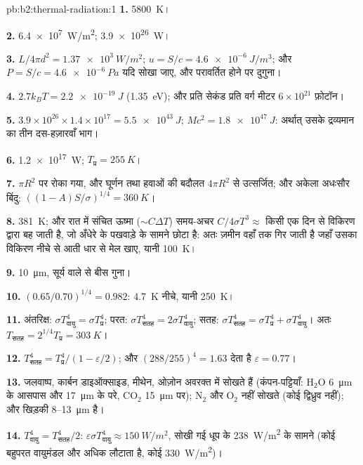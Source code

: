 \begin{solution}{pb:b2:thermal-radiation:1}
\textbf{1.} \qty{5800}{K}।

\textbf{2.} \qty{6.4e7}{W/m^2}; \qty{3.9e26}{W}।

\textbf{3.} $L/4\pi d^2 = \qty{1.37e3}{W/m^2}$; $u = S/c = \qty{4.6e-6}{J/m^3}$;
और $P = S/c = \qty{4.6e-6}{Pa}$ यदि सोखा जाए, और परावर्तित होने पर दुगुना।

\textbf{4.} $2.7k_BT = \qty{2.2e-19}{J}$ (\qty{1.35}{eV}); और प्रति सेकंड प्रति वर्ग
मीटर $6 \times 10^{21}$ फ़ोटॉन।

\textbf{5.} $3.9 \times 10^{26} \times 1.4 \times 10^{17} = \qty{5.5e43}{J}$; $Mc^2 =
\qty{1.8e47}{J}$: अर्थात् उसके द्रव्यमान का तीन दस-हज़ारवाँ भाग।

\textbf{6.} \qty{1.2e17}{W}; $T_{\text{प्र}} = \qty{255}{K}$।

\textbf{7.} $\pi R^2$ पर रोका गया, और घूर्णन तथा हवाओं की बदौलत $4\pi R^2$ से
उत्सर्जित; और अकेला अधःसौर बिंदु: $((1 - A)S/\sigma)^{1/4} =
\qty{360}{K}$।

\textbf{8.} \qty{381}{K}; और रात में संचित ऊष्मा ($\sim C\Delta T$) समय-अचर
$C/4\sigma T^3 \approx$ किसी एक दिन से विकिरण द्वारा बह जाती है, जो अँधेरे के पखवाड़े के
सामने छोटा है: अतः ज़मीन वहाँ तक गिर जाती है जहाँ उसका
विकिरण नीचे से आती धार से मेल खाए, यानी \qty{100}{K}।

\textbf{9.} \qty{10}{\micro m}, सूर्य वाले से बीस गुना।

\textbf{10.} $(0.65/0.70)^{1/4} = 0.982$: \qty{4.7}{K} नीचे, यानी \qty{250}{K}।

\textbf{11.} अंतरिक्ष: $\sigma T_{\text{वायु}}^4 = \sigma T_{\text{प्र}}^4$; परत: $\sigma
T_{\text{सतह}}^4 = 2\sigma T_{\text{वायु}}^4$; सतह: $\sigma T_{\text{सतह}}^4 = \sigma
T_{\text{प्र}}^4 + \sigma T_{\text{वायु}}^4$। अतः $T_{\text{सतह}} = 2^{1/4}T_{\text{प्र}} = \qty{303}{K}$।

\textbf{12.} $T_{\text{सतह}}^4 = T_{\text{प्र}}^4/(1 - \varepsilon/2)$; और $(288/255)^4 = 1.63$
देता है $\varepsilon = 0.77$।

\textbf{13.} जलवाष्प, कार्बन डाइऑक्साइड, मीथेन, ओज़ोन अवरक्त में सोखते हैं
(कंपन-पट्टियाँ: H$_2$O \qty{6}{\micro m} के आसपास और \qty{17}{\micro m} के
परे, CO$_2$ \qty{15}{\micro m} पर); N$_2$ और O$_2$ नहीं सोखते (कोई
द्विध्रुव नहीं); और खिड़की \qty{8}{}--\qty{13}{\micro m} है।

\textbf{14.} $T_{\text{वायु}}^4 = T_{\text{सतह}}^4/2$: $\varepsilon\sigma T_{\text{वायु}}^4 \approx
\qty{150}{W/m^2}$, सोखी गई धूप के \qty{238}{W/m^2} के सामने (कोई
बहुपरत वायुमंडल और अधिक लौटाता है, कोई \qty{330}{W/m^2})।


\end{solution}
